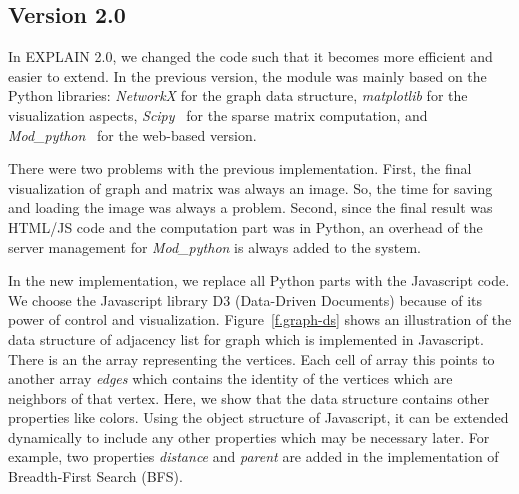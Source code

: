 \documentclass[12pt, twoside,a4paper,toc=bibliography]{scrbook}
\begin{document}
\subsection{Version 2.0}
\label{s.impl.explain2}
In EXPLAIN 2.0, we changed the code such that it becomes more efficient and easier to extend.
In the previous version, the module was mainly based on the Python libraries:
\textit{NetworkX} \cite{networkx2008} for the graph data structure,
\textit{matplotlib} \cite{matplotlib2007} for the visualization aspects,
\textit{Scipy}~\cite{scipy2001} for the sparse matrix computation, and
\textit{Mod\_python}~\cite{modpython2013} for the web-based version.

There were two problems with the previous implementation. First, the final visualization
of graph and matrix was always an image.
So, the time for saving and loading the image was always a problem.
Second, since the final result was HTML/JS code and the computation part was in Python,
an overhead of the server management for \textit{Mod\_python} is always added to the system.

In the new implementation, we replace all Python parts with the Javascript code.
We choose the Javascript library D3 (Data-Driven Documents)
because of its power of control and visualization.
Figure~\ref{f.graph-ds} shows an illustration
of the data structure of adjacency list for graph which is implemented in Javascript.
There is an the array representing the vertices.
Each cell of array this points to another array \textit{edges} which contains
the identity of the vertices which are neighbors of that vertex.
Here, we show that the data structure contains other properties like colors.
Using the object structure of Javascript,
it can be extended dynamically to include any other properties which may be necessary later. For example, two properties \textit{distance} and \textit{parent} are added
in the implementation of Breadth-First Search (BFS).
\end{document}
